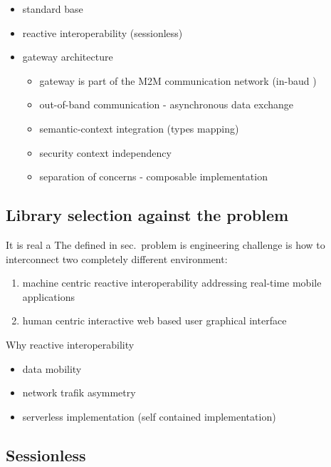 \documentclass[
]{article}
\providecommand{\tightlist}{%
  \setlength{\itemsep}{0pt}\setlength{\parskip}{0pt}}
\begin{document}
\begin{itemize}
\tightlist
\item
  standard base
\item
  reactive interoperability (sessionless)
\item
  gateway architecture

  \begin{itemize}
  \tightlist
  \item
    gateway is part of the M2M communication network (in-baud )
  \item
    out-of-band communication - asynchronous data exchange
  \item
    semantic-context integration (types mapping)
  \item
    security context independency
  \item
    separation of concerns - composable implementation
  \end{itemize}
\end{itemize}

\hypertarget{library-selection-against-the-problem}{%
\subsection{Library selection against the
problem}\label{library-selection-against-the-problem}}

It is real a The defined in sec.~problem is engineering challenge is how
to interconnect two completely different environment:

\begin{enumerate}
\def\labelenumi{\arabic{enumi}.}
\tightlist
\item
  machine centric reactive interoperability addressing real-time mobile
  applications
\item
  human centric interactive web based user graphical interface
\end{enumerate}

Why reactive interoperability

\begin{itemize}
\tightlist
\item
  data mobility
\item
  network trafik asymmetry
\item
  serverless implementation (self contained implementation)
\end{itemize}

\hypertarget{sessionless}{%
\subsection{Sessionless}\label{sessionless}}
\end{document}
